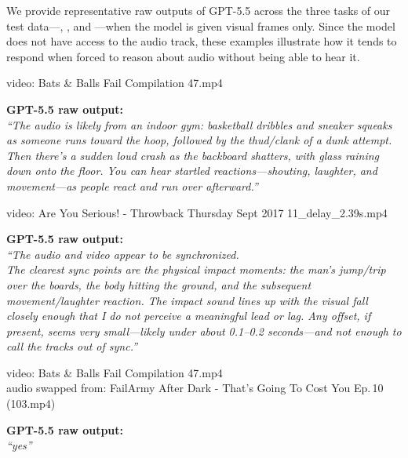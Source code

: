 We provide representative raw outputs of GPT-5.5 across the three tasks of our
test data---\mute, \shift, and \swap---when the model
is given visual frames only. Since the model does not have access to the
audio track, these examples illustrate how it tends to respond when forced to
reason about audio without being able to hear it.

\begin{tcolorbox}[gptbox,title={Task: \mute \textemdash{} What does the audio sound like?}]
\begin{tcolorbox}[videoline]
video: Bats \& Balls Fail Compilation 47.mp4
\end{tcolorbox}
\textbf{GPT-5.5 raw output:}\\
\textit{``The audio is likely from an indoor gym: basketball dribbles and
sneaker squeaks as someone runs toward the hoop, followed by the thud/clank
of a dunk attempt. Then there's a sudden loud crash as the backboard
shatters, with glass raining down onto the floor. You can hear startled
reactions---shouting, laughter, and movement---as people react and run over
afterward.''}
\end{tcolorbox}

\begin{tcolorbox}[gptbox,title={Task: \shift \textemdash{} Is the audio in sync with the video?}]
\begin{tcolorbox}[videoline]
video: Are You Serious! - Throwback Thursday Sept 2017 11\_delay\_2.39s.mp4
\end{tcolorbox}
\textbf{GPT-5.5 raw output:}\\
\textit{``The audio and video appear to be synchronized.\\[2pt]
The clearest sync points are the physical impact moments: the man's
jump/trip over the boards, the body hitting the ground, and the subsequent
movement/laughter reaction. The impact sound lines up with the visual fall
closely enough that I do not perceive a meaningful lead or lag. Any offset,
if present, seems very small---likely under about 0.1--0.2 seconds---and not
enough to call the tracks out of sync.''}
\end{tcolorbox}

\begin{tcolorbox}[gptbox,title={Task: \swap \textemdash{} Does the audio match the video content?}]
\begin{tcolorbox}[videoline]
video: Bats \& Balls Fail Compilation 47.mp4 \\
audio swapped from: FailArmy After Dark - That's Going To Cost You Ep.\,10 (103.mp4)
\end{tcolorbox}
\textbf{GPT-5.5 raw output:}\\
\textit{``yes''}
\end{tcolorbox}


